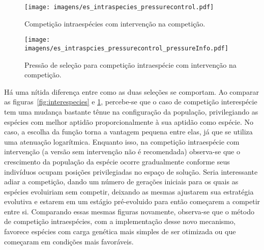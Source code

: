 \begin{figure}[h!t]
\centering
\texttt{[image: imagens/es\_intraspecies\_pressurecontrol.pdf]}
\caption[Competição intraespécies com intervenção na
competição.]{Competição intraespécies com intervenção na competição.}
\label{fig:intraspecies_pressurecontrol}
\end{figure}

\begin{figure}[h!t]
\centering
\texttt{[image: imagens/es\_intraspcies\_pressurecontrol\_pressureInfo.pdf]}
\caption[Pressão de seleção para competição intraespécie com
intervenção na competição.]{Pressão de seleção para competição
intraespécie com intervenção na competição.}
\label{fig:intraspecies_pressurecontrol_info}
\end{figure}

Há uma nítida diferença entre como as duas seleções se comportam. Ao
comparar as figuras~\ref{fig:interespecies} e
\ref{fig:intraspecies_pressurecontrol}, percebe-se que o caso de
competição interespécie tem uma mudança bastante tênue na configuração
da população, privilegiando as espécies com melhor aptidão
proporcionalmente à sua aptidão como espécie. No caso, a escolha da
função torna a vantagem pequena entre elas, já que se utiliza uma
atenuação logarítmica. Enquanto isso, na competição intraespécie com
intervenção (a versão sem intervenção não é recomendada) observa-se
que o crescimento da população da espécie ocorre gradualmente conforme
seus indivíduos ocupam posições privilegiadas no espaço de
solução. Seria interessante adiar a competição, dando um número de
gerações iniciais para os quais as espécies evoluiriam sem competir,
deixando as mesmas ajustarem sua estratégia evolutiva e estarem
em um estágio pré-evoluido para então começarem a competir entre si.
Comparando essas mesmas figuras novamente, observa-se que o método
de competição intraespécies, com a implementação desse novo mecanismo,
favorece espécies com carga genética mais simples de ser otimizada ou
que começaram em condições mais favoráveis.

